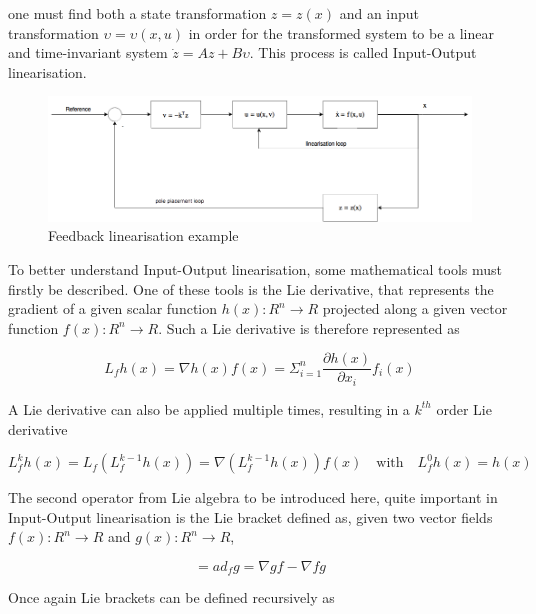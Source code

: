 one must find both a state transformation $z=z(x)$ and an input transformation $\upsilon = \upsilon(x,u)$ in order for the transformed system to be a linear and time-invariant system $\dot{z} = Az+B\upsilon$. This process is called Input-Output linearisation. 

\begin{figure}[!htb]
  \centering
  \includegraphics[width=1\textwidth]{Figures/NLI}
  \caption[Feedback linearisation example]{Feedback linearisation example \cite{Slotine+Li}}
  \label{fig:nli}
\end{figure}

To better understand Input-Output linearisation, some mathematical tools must firstly be described. One of these tools is the Lie derivative, that represents the gradient of a given scalar function $h(x):R^n\rightarrow R$ projected along a given vector function $f(x):R^n\rightarrow R$. Such a Lie derivative is therefore represented as

\begin{equation}
L_fh(x) = \nabla h(x)f(x) = \Sigma^n_{i=1}\dfrac{\partial h(x)}{\partial x_i}f_i(x)
\end{equation}

A Lie derivative can also be applied multiple times, resulting in a $k^{th}$ order Lie derivative

\begin{equation}
L^k_fh(x)=L_f\left(L^{k-1}_fh(x)\right)=\nabla \left(L^{k-1}_fh(x)\right)f(x) \quad \text{with} \quad L^0_fh(x)=h(x)
\end{equation}

The second operator from Lie algebra to be introduced here, quite important in Input-Output linearisation is the Lie bracket defined as, given two vector fields $f(x):R^n\rightarrow R$ and $g(x):R^n\rightarrow R$,

\begin{equation}
[f,g] = ad_f g = \nabla g f - \nabla f g
\end{equation}

Once again Lie brackets can be defined recursively as

